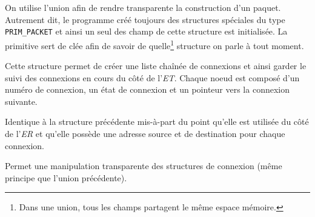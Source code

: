 \documentclass[11pt,french]{article}
\begin{document}
            
            On utilise l'union afin de rendre transparente la construction d'un paquet. Autrement dit, le programme créé toujours des structures spéciales 
            du type \texttt{PRIM\_PACKET} et ainsi un seul des champ de cette structure est initialisée. La primitive sert de clée afin de savoir de
            quelle\footnote{Dans une union, tous les champs partagent le même espace mémoire.} structure on parle à tout moment.

            
            Cette structure permet de créer une liste chaînée de connexions et ainsi garder le suivi des connexions en cours du côté de l'\emph{ET}. 
            Chaque noeud est composé d'un numéro de connexion, un état de connexion et un pointeur vers la connexion suivante.

            
            Identique à la structure précédente mis-à-part du point qu'elle est utilisée du côté de l'\emph{ER} et qu'elle possède une adresse source et
            de destination pour chaque connexion.

            
            Permet une manipulation transparente des structures de connexion (même principe que l'union précédente).\\
\end{document}
